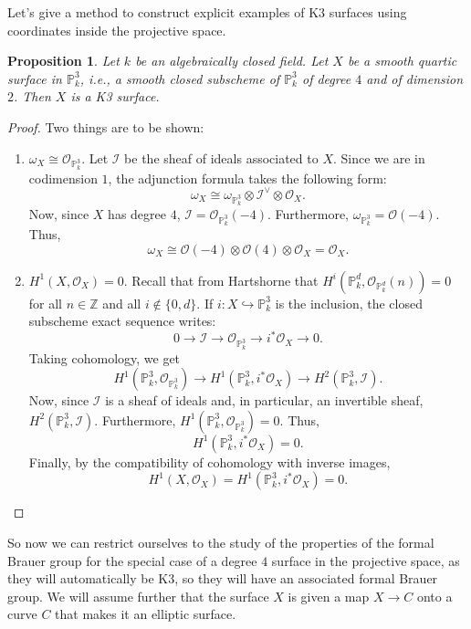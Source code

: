 \documentclass{report}
\newtheorem{proposition}[equation]{Proposition}
\theoremstyle{definition}
\begin{document}
Let's give a method \cite[Example~2.2]{liedtke2016lectures} to construct explicit examples of K3 surfaces using coordinates inside the projective space.

\begin{proposition}
Let $k$ be an algebraically closed field. Let $X$ be a smooth quartic surface in $\mathbb{P}_k^3$, i.e., a smooth closed subscheme of $\mathbb{P}_k^3$ of degree $4$ and of dimension $2$. Then $X$ is a K3 surface.
\end{proposition}

\begin{proof}
Two things are to be shown:
\begin{enumerate}
\item $\omega_X\cong\mathcal{O}_{\mathbb{P}_k^3}$. Let $\mathcal{I}$ be the sheaf of ideals associated to $X$. Since we are in codimension $1$, the adjunction formula takes the following form:
\[\omega_X\cong\omega_{\mathbb{P}_k^3}\otimes\mathcal{I}^{\vee}\otimes\mathcal{O}_X.\]
Now, since $X$ has degree $4$, $\mathcal{I}=\mathcal{O}_{\mathbb{P}_k^3}(-4)$. Furthermore, $\omega_{\mathbb{P}_k^3}=\mathcal{O}(-4)$. Thus,
\[\omega_X\cong\mathcal{O}(-4)\otimes\mathcal{O}(4)\otimes\mathcal{O}_X=\mathcal{O}_X.\]

\item $H^1(X,\mathcal{O}_X)=0$. Recall that from Hartshorne \cite[Theorem~III.5.1]{hartshorne1977algebraic} that $H^i(\mathbb{P}_k^d,\mathcal{O}_{\mathbb{P}_k^d}(n))=0$ for all $n\in\mathbb{Z}$ and all $i\notin\{0,d\}$. If $i:X\hookrightarrow\mathbb{P}_k^3$ is the inclusion, the closed subscheme exact sequence writes:
\[0\longrightarrow\mathcal{I}\longrightarrow\mathcal{O}_{\mathbb{P}_k^3}\longrightarrow i^*\mathcal{O}_X\longrightarrow0.\]
Taking cohomology, we get
\[H^1(\mathbb{P}_k^3,\mathcal{O}_{\mathbb{P}_k^3})\longrightarrow H^1(\mathbb{P}_k^3,i^*\mathcal{O}_X)\longrightarrow H^2(\mathbb{P}_k^3,\mathcal{I}).\]
Now, since $\mathcal{I}$ is a sheaf of ideals and, in particular, an invertible sheaf, $H^2(\mathbb{P}_k^3,\mathcal{I})$. Furthermore, $H^1(\mathbb{P}_k^3,\mathcal{O}_{\mathbb{P}_k^3})=0$. Thus,
\[H^1(\mathbb{P}_k^3,i^*\mathcal{O}_X)=0.\]
Finally, by the compatibility of cohomology with inverse images,
\[H^1(X,\mathcal{O}_X)=H^1(\mathbb{P}_k^3,i^*\mathcal{O}_X)=0.\]
\end{enumerate}
\end{proof}

So now we can restrict ourselves to the study of the properties of the formal Brauer group for the special case of a degree $4$ surface in the projective space, as they will automatically be K3, so they will have an associated formal Brauer group. We will assume further that the surface $X$ is given a map $X\rightarrow C$ onto a curve $C$ that makes it an elliptic surface.
\end{document}
